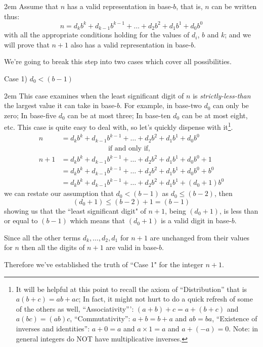 \documentclass{article}
\newenvironment{jprIn}{\begin{adjustwidth}{2em}{}}{\end{adjustwidth}}
\begin{document}
\begin{jprIn}
Assume that $n$ has a valid representation in base-$b$,
that is, $n$ can be written thus: 
\[n=d_kb^k+d_{k-1}b^{k-1}+\dots+d_2b^2+d_1b^1+d_0b^0\]
with all the appropriate conditions holding for the
values of $d_i$, $b$ and $k$;
and we will prove that $n+1$ also has a valid representation in base-$b$.

We're going to break this step into two cases which cover all possibilities.

\filbreak
Case 1) $d_0<(b-1)$

\begin{jprIn}
This case examines when the least significant
digit of $n$ is \emph{strictly-less-than} the largest value it can take in base-$b$.
For example, in base-two $d_0$ can only be zero;
In base-five $d_0$ can be at most three;
In base-ten $d_0$ can be at most eight, etc.
This case is
quite easy to deal with, so let's quickly dispense with it\footnote{It will be helpful at this point to recall the axiom of ``Distribution'' that is $a(b+c)=ab+ac$;
In fact, it might not hurt to do a quick refresh of some of the others as well, ``Associativity''': $(a+b)+c=a+(b+c)$ and $a(bc)=(ab)c$, ``Commutativity'': $a+b=b+a$ and $ab=ba$, ``Existence of inverses and identities'': $a+0=a$ and $a\times1=a$ and $a+(-a)=0$. Note: in general integers do NOT have multiplicative inverses.}.
\begin{align*}
n &= d_kb^k+d_{k-1}b^{k-1}+\dots+d_2b^2+d_1b^1+d_0b^0\\
&\;\;\;\;\;\;\;\;\;\;\;\;\;\;\;\;\;\;\;\;\;\;\;\;\text{if and only if,}\\
n+1 &= d_kb^k+d_{k-1}b^{k-1}+\dots+d_2b^2+d_1b^1+d_0b^0 + 1\\
&= d_kb^k+d_{k-1}b^{k-1}+\dots+d_2b^2+d_1b^1+d_0b^0 + b^0\\
&= d_kb^k+d_{k-1}b^{k-1}+\dots+d_2b^2+d_1b^1 + (d_0+1)b^0
\end{align*}
we can restate our assumption that $d_0<(b-1)$ as $d_0\le(b-2)$, then
\[(d_0+1)\le(b-2)+1=(b-1)\]
showing us that the ``least significant digit"
of $n+1$, being $(d_0+1)$, is less than or equal to $(b-1)$ which means that
$(d_0+1)$ is a valid digit in base-$b$.

Since all the other terms $d_k,\dots,d_2,d_1$
for $n+1$ are unchanged from their values for
$n$ then all the digits of $n+1$ are valid in base-$b$.

Therefore we've established the truth of ``Case 1" for the integer $n+1$.
\end{jprIn}
\bigskip


\end{jprIn}
\end{document}
